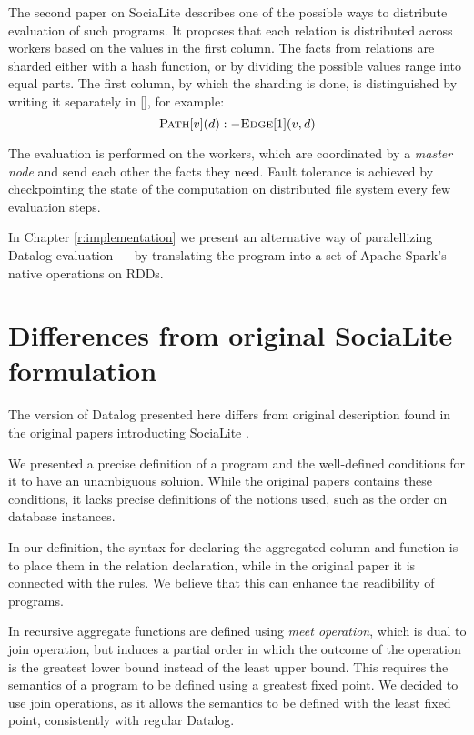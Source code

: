 The second paper on SociaLite \cite{distsoc} describes one of the possible ways to distribute evaluation of such programs. It proposes that each relation is distributed across workers based on the values in the first column. The facts from relations are sharded either with a hash function, or by dividing the possible values range into equal parts. The first column, by which the sharding is done, is distinguished by writing it separately in [], for example:
$$\textsc{Path}[v](d) :- \textsc{Edge}[1](v, d)$$

The evaluation is performed on the workers, which are coordinated by a \emph{master node} and send each other the facts they need. Fault tolerance is achieved by checkpointing the state of the computation on distributed file system every few evaluation steps.

In Chapter \ref{r:implementation} we present an alternative way of paralellizing Datalog evaluation --- by translating the program into a set of Apache Spark's native operations on RDDs.

\section{Differences from original SociaLite formulation}

The version of Datalog presented here differs from original description found in the original papers introducting SociaLite \cite{socialite, distsoc}.

We presented a precise definition of a \datalogra program and the well-defined conditions for it to have an unambiguous soluion. While the original papers contains these conditions, it lacks precise definitions of the notions used, such as the order on database instances.

In our definition, the syntax for declaring the aggregated column and function is to place them in the relation declaration, while in the original paper it is connected with the rules. We believe that this can enhance the readibility of \datalogra programs.

In \cite{socialite, distsoc} recursive aggregate functions are defined using \emph{meet operation}, which is dual to join operation, but induces a partial order in which the outcome of the operation is the greatest lower bound instead of the least upper bound. This requires the semantics of a program to be defined using a greatest fixed point. We decided to use join operations, as it allows the semantics to be defined with the least fixed point, consistently with regular Datalog.
